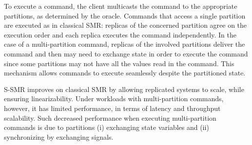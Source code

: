 To execute a command, the client multicasts the command to the appropriate
partitions, as determined by the oracle. Commands that access a single partition
are executed as in classical SMR: replicas of the concerned partition agree on
the execution order and each replica executes the command independently. In the
case of a multi-partition command, replicas of the involved partitions deliver
the command and then may need to exchange state in order to execute the command
since some partitions may not have all the values read in the command. This
mechanism allows commands to execute seamlessly despite the partitioned state.

S-SMR improves on classical SMR by allowing replicated systems to scale, while
ensuring linearizability. Under workloads with multi-partition commands,
however, it has limited performance, in terms of latency and throughput
scalability. Such decreased performance when executing multi-partition commands
is due to partitions (i) exchanging state variables and (ii) synchronizing by
exchanging signals.

